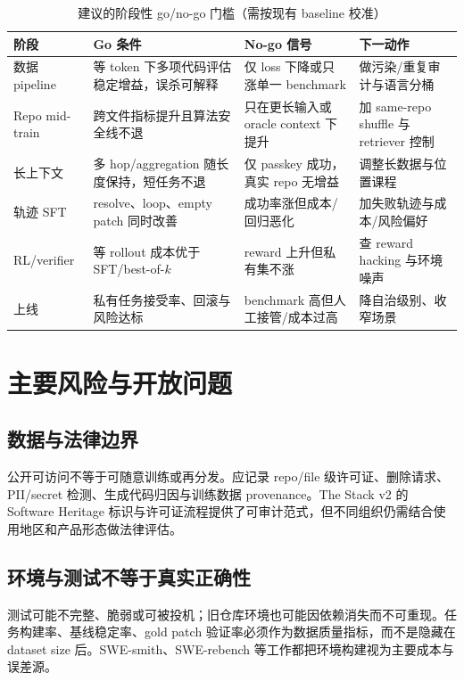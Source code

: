 \documentclass[10pt,a4paper,UTF8,fontset=none]{ctexart}
\begin{document}
\begin{table}[htbp]
\centering
\caption{建议的阶段性 go/no-go 门槛（需按现有 baseline 校准）}
\label{tab:gates}
\small
\begin{tabularx}{\textwidth}{p{2.5cm}YYp{3.2cm}}
\toprule
阶段 & Go 条件 & No-go 信号 & 下一动作 \\
\midrule
数据 pipeline & 等 token 下多项代码评估稳定增益，误杀可解释 & 仅 loss 下降或只涨单一 benchmark & 做污染/重复审计与语言分桶 \\
Repo mid-train & 跨文件指标提升且算法安全线不退 & 只在更长输入或 oracle context 下提升 & 加 same-repo shuffle 与 retriever 控制 \\
长上下文 & 多 hop/aggregation 随长度保持，短任务不退 & 仅 passkey 成功，真实 repo 无增益 & 调整长数据与位置课程 \\
轨迹 SFT & resolve、loop、empty patch 同时改善 & 成功率涨但成本/回归恶化 & 加失败轨迹与成本/风险偏好 \\
RL/verifier & 等 rollout 成本优于 SFT/best-of-$k$ & reward 上升但私有集不涨 & 查 reward hacking 与环境噪声 \\
上线 & 私有任务接受率、回滚与风险达标 & benchmark 高但人工接管/成本过高 & 降自治级别、收窄场景 \\
\bottomrule
\end{tabularx}
\end{table}

\section{主要风险与开放问题}

\subsection{数据与法律边界}

公开可访问不等于可随意训练或再分发。应记录 repo/file 级许可证、删除请求、PII/secret 检测、生成代码归因与训练数据 provenance。The Stack v2 的 Software Heritage 标识与许可证流程提供了可审计范式\cite{lozhkov2024starcoder2}，但不同组织仍需结合使用地区和产品形态做法律评估。

\subsection{环境与测试不等于真实正确性}

测试可能不完整、脆弱或可被投机；旧仓库环境也可能因依赖消失而不可重现。任务构建率、基线稳定率、gold patch 验证率必须作为数据质量指标，而不是隐藏在 dataset size 后。SWE-smith、SWE-rebench 等工作都把环境构建视为主要成本与误差源\cite{yang2025swesmith,badertdinov2025swerebench}。
\end{document}
